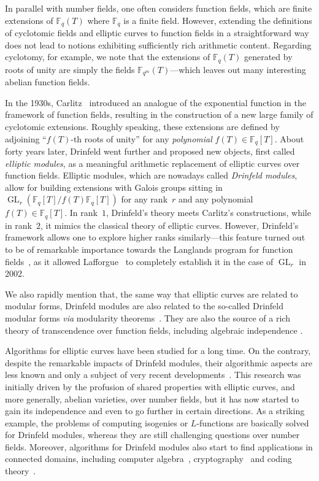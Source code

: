 \documentclass[11pt]{article}
\theoremstyle{definition}
\newcommand\F{\mathbb{F}}
\newcommand\Fq{\mathbb{F}_q}
\newcommand\Fqm{\F_{q^m}}
\DeclareMathOperator{\GL}{\mathrm{GL}}
\begin{document}
In parallel with number fields, one often considers function fields, which are finite extensions of $\Fq(T)$ where $\Fq$ is a finite field.
However, extending the definitions of cyclotomic fields and elliptic curves to function fields in a straightforward way does not lead to notions exhibiting sufficiently rich arithmetic content. Regarding cyclotomy, for example, we note that the extensions of $\Fq(T)$ generated by roots of unity are simply the fields $\Fqm(T)$---which leaves out many interesting abelian function fields.

In the 1930s, Carlitz~\cite{C35} introduced an analogue of the exponential function in the framework of function fields, resulting in the construction of a new large family of cyclotomic extensions. Roughly speaking, these extensions are defined by adjoining ``$f(T)$-th roots of unity'' for any \emph{polynomial} $f(T) \in \Fq[T]$.
About forty years later, Drinfeld went further and proposed new objects, first called \emph{elliptic modules}, as a meaningful arithmetic replacement of elliptic curves over function fields.
Elliptic modules, which are nowadays called \emph{Drinfeld modules}, allow for building extensions with Galois groups sitting in $\GL_r(\Fq[T]/f(T)\Fq[T])$ for any rank~$r$ and any polynomial $f(T) \in \Fq[T]$.
In rank~$1$, Drinfeld's theory meets Carlitz's constructions, while in rank~$2$, it mimics the classical theory of elliptic curves.
However, Drinfeld's framework allows one to explore higher ranks similarly---this feature turned out to be of remarkable importance towards the Langlands program for function fields~\cite{drinfeld1980langlands}, as it allowed Lafforgue~\cite{lafforgue2002chtoucas} to completely establish it in the case of $\GL_r$ in 2002.

We also rapidly mention that, the same way that elliptic curves are related to modular forms, Drinfeld modules are also related to the so-called Drinfeld modular forms \emph{via} modularity theorems~\cite{drinfel1974elliptic,gekeler-reversat-96}.
They are also the source of a rich theory of transcendence over function fields, including algebraic independence \cite[Chapter~10]{Tha04}.

Algorithms for elliptic curves have been studied for a long time.
On the contrary, despite the remarkable impacts of Drinfeld modules, their algorithmic aspects are less known and only a subject of very recent developments~\cite{caranay_computing_2018,caranay2020computing,W22,ayotte2023arithmetic,CL23, leudiere_morphisms_2024, caruso_computation_2025, gloch_algorithms_2025}.
This research was initially driven by the profusion of shared properties with elliptic curves, and more generally, abelian varieties, over number fields, but it has now started to gain its independence and even to go further in certain directions.
As a striking example, the problems of computing isogenies or $L$-functions are basically solved for Drinfeld modules, whereas they are still challenging questions over number fields.
Moreover, algorithms for Drinfeld modules also start to find applications in connected domains, including computer algebra~\cite{doliskani_drinfeld_2021}, cryptography~\cite{scanlon_public_2001,joux_drinfeld_2019,leudiere_hard_2022} and coding theory~\cite{bassa2015good,BDM24preprint}.
\end{document}
